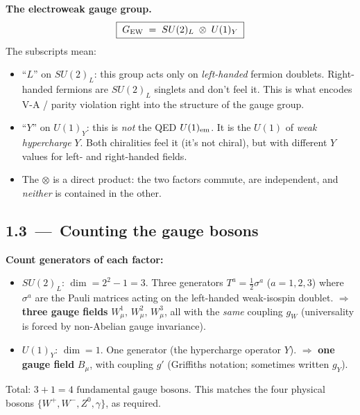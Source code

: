 \documentclass[11pt]{article}
\begin{document}
\begin{conceptbox}
\textbf{The electroweak gauge group.}
\[
\boxed{\;G_{\rm EW} \;=\; SU(2)_L \;\otimes\; U(1)_Y\;}
\]
The subscripts mean:
\begin{itemize}[leftmargin=*]
  \item ``$L$'' on $SU(2)_L$: this group acts only on \emph{left-handed} fermion doublets.
        Right-handed fermions are $SU(2)_L$ singlets and don't feel it. This is what
        encodes V-A / parity violation right into the structure of the gauge group.
  \item ``$Y$'' on $U(1)_Y$: this is \emph{not} the QED $U(1)_{\rm em}$. It is the
        $U(1)$ of \emph{weak hypercharge} $Y$. Both chiralities feel it (it's not chiral),
        but with different $Y$ values for left- and right-handed fields.
  \item The $\otimes$ is a direct product: the two factors commute, are independent, and
        \emph{neither} is contained in the other.
\end{itemize}
\end{conceptbox}

\subsection*{1.3 \,---\, Counting the gauge bosons}

\begin{stepbox}
\textbf{Count generators of each factor:}
\begin{itemize}[leftmargin=*]
  \item $SU(2)_L$: $\dim = 2^2 - 1 = 3$. Three generators
        $T^a = \tfrac{1}{2}\sigma^a$ ($a = 1, 2, 3$) where $\sigma^a$ are the Pauli
        matrices acting on the left-handed weak-isospin doublet.
        $\Rightarrow$ \textbf{three gauge fields} $W^1_\mu,\, W^2_\mu,\, W^3_\mu$,
        all with the \emph{same} coupling $g_W$ (universality is forced by non-Abelian gauge
        invariance).
  \item $U(1)_Y$: $\dim = 1$. One generator (the hypercharge operator $Y$).
        $\Rightarrow$ \textbf{one gauge field} $B_\mu$, with coupling $g'$ (Griffiths
        notation; sometimes written $g_Y$).
\end{itemize}
Total: $3 + 1 = \boxed{4 \text{ fundamental gauge bosons}}$. This matches the four physical
bosons $\{W^+, W^-, Z^0, \gamma\}$, as required.
\end{stepbox}
\end{document}
